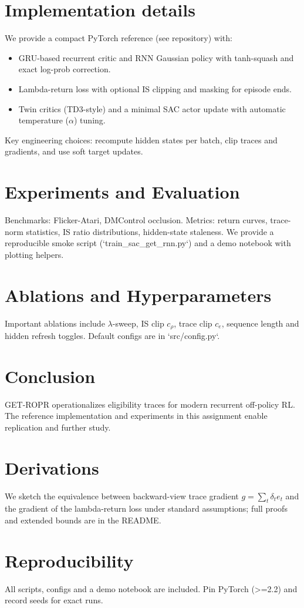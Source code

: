 \documentclass[twocolumn]{article}
\begin{document}
\section{Implementation details}
We provide a compact PyTorch reference (see repository) with:
\begin{itemize}
\item GRU-based recurrent critic and RNN Gaussian policy with tanh-squash and exact log-prob correction.
\item Lambda-return loss with optional IS clipping and masking for episode ends.
\item Twin critics (TD3-style) and a minimal SAC actor update with automatic temperature (\(\alpha\)) tuning.
\end{itemize}
Key engineering choices: recompute hidden states per batch, clip traces and gradients, and use soft target updates.

\section{Experiments and Evaluation}
Benchmarks: Flicker-Atari, DMControl occlusion. Metrics: return curves, trace-norm statistics, IS ratio distributions, hidden-state staleness.
We provide a reproducible smoke script (`train_sac_get_rnn.py`) and a demo notebook with plotting helpers.

\section{Ablations and Hyperparameters}
Important ablations include \(\lambda\)-sweep, IS clip \(c_\rho\), trace clip \(c_e\), sequence length and hidden refresh toggles. Default configs are in `src/config.py`.

\section{Conclusion}
GET-ROPR operationalizes eligibility traces for modern recurrent off-policy RL. The reference implementation and experiments in this assignment enable replication and further study.

\appendix
\section{Derivations}
We sketch the equivalence between backward-view trace gradient \(g=\sum_t \delta_t e_t\) and the gradient of the lambda-return loss under standard assumptions; full proofs and extended bounds are in the README.

\section{Reproducibility}
All scripts, configs and a demo notebook are included. Pin PyTorch (>=2.2) and record seeds for exact runs.



\end{document}
